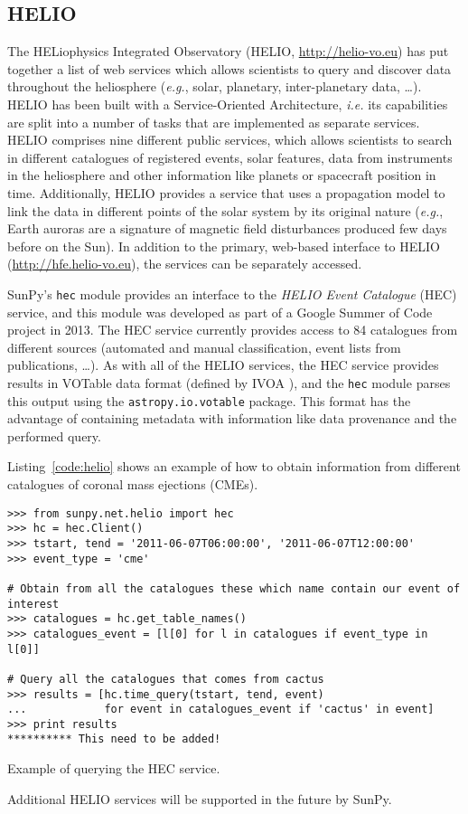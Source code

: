 \subsection{HELIO}\label{ssec:helio}

The HELiophysics Integrated Observatory 
(HELIO, \url{http://helio-vo.eu}) has put together a list of web 
services which allows scientists to query and discover data throughout 
the heliosphere (\textit{e.g.}, solar, planetary, inter-planetary data, 
\ldots)\citep{dps2012}.
HELIO has been built with a Service-Oriented Architecture, 
\textit{i.e.} its capabilities are split into a number of tasks that are 
implemented as separate services. 
HELIO comprises nine different public services, which allows scientists
to search in different catalogues of registered events, solar features,
data from instruments in the heliosphere and other information like planets or 
spacecraft position in time. 
Additionally, HELIO provides a service that uses a propagation model to link 
the data in different points of the solar system by its original nature 
(\textit{e.g.}, Earth auroras are a signature of magnetic field disturbances 
produced few days before on the Sun).
In addition to the primary, web-based interface to HELIO
(\url{http://hfe.helio-vo.eu}), the services can be separately accessed.

SunPy's \texttt{hec} module provides an interface to the
\textit{HELIO Event Catalogue} (HEC) service, and this module was developed as
part of a Google Summer of Code project in 2013.
The HEC service currently provides access to 84 catalogues from different
sources (automated and manual classification, event lists from publications, \ldots).
As with all of the HELIO services, the HEC service provides results in VOTable 
data format (defined by IVOA \cite{ochsenbein_ivoa_2011}), and the \texttt{hec}
module parses this output using the \texttt{astropy.io.votable} package.
This format has the advantage of containing metadata with information like
data provenance and the performed query.

Listing~\ref{code:helio} shows an example of how to obtain information
from different catalogues of coronal mass ejections (CMEs).

\begin{listing}[h]
\begin{verbatim}
>>> from sunpy.net.helio import hec
>>> hc = hec.Client()
>>> tstart, tend = '2011-06-07T06:00:00', '2011-06-07T12:00:00'
>>> event_type = 'cme'

# Obtain from all the catalogues these which name contain our event of interest
>>> catalogues = hc.get_table_names()
>>> catalogues_event = [l[0] for l in catalogues if event_type in l[0]]

# Query all the catalogues that comes from cactus
>>> results = [hc.time_query(tstart, tend, event) 
...            for event in catalogues_event if 'cactus' in event]
>>> print results
********** This need to be added!
\end{verbatim}
\caption{Example of querying the HEC service.}
\label{code:helio}
\end{listing}

Additional HELIO services will be supported in the future by SunPy.
